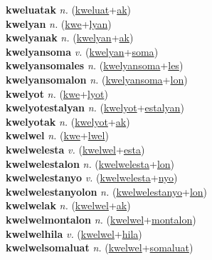 \textbf{kweluatak} \textit{n.} (\hyperref[kweluat]{kweluat}+\hyperref[ak]{ak})
 \label{kweluatak} \\
\textbf{kwelyan} \textit{n.} (\hyperref[kwe]{kwe}+\hyperref[lyan]{lyan})
 \label{kwelyan} \\
\textbf{kwelyanak} \textit{n.} (\hyperref[kwelyan]{kwelyan}+\hyperref[ak]{ak})
 \label{kwelyanak} \\
\textbf{kwelyansoma} \textit{v.} (\hyperref[kwelyan]{kwelyan}+\hyperref[soma]{soma})
 \label{kwelyansoma} \\
\textbf{kwelyansomales} \textit{n.} (\hyperref[kwelyansoma]{kwelyansoma}+\hyperref[les]{les})
 \label{kwelyansomales} \\
\textbf{kwelyansomalon} \textit{n.} (\hyperref[kwelyansoma]{kwelyansoma}+\hyperref[lon]{lon})
 \label{kwelyansomalon} \\
\textbf{kwelyot} \textit{n.} (\hyperref[kwe]{kwe}+\hyperref[lyot]{lyot})
 \label{kwelyot} \\
\textbf{kwelyotestalyan} \textit{n.} (\hyperref[kwelyot]{kwelyot}+\hyperref[estalyan]{estalyan})
 \label{kwelyotestalyan} \\
\textbf{kwelyotak} \textit{n.} (\hyperref[kwelyot]{kwelyot}+\hyperref[ak]{ak})
 \label{kwelyotak} \\
\textbf{kwelwel} \textit{n.} (\hyperref[kwe]{kwe}+\hyperref[lwel]{lwel})
 \label{kwelwel} \\
\textbf{kwelwelesta} \textit{v.} (\hyperref[kwelwel]{kwelwel}+\hyperref[esta]{esta})
 \label{kwelwelesta} \\
\textbf{kwelwelestalon} \textit{n.} (\hyperref[kwelwelesta]{kwelwelesta}+\hyperref[lon]{lon})
 \label{kwelwelestalon} \\
\textbf{kwelwelestanyo} \textit{v.} (\hyperref[kwelwelesta]{kwelwelesta}+\hyperref[nyo]{nyo})
 \label{kwelwelestanyo} \\
\textbf{kwelwelestanyolon} \textit{n.} (\hyperref[kwelwelestanyo]{kwelwelestanyo}+\hyperref[lon]{lon})
 \label{kwelwelestanyolon} \\
\textbf{kwelwelak} \textit{n.} (\hyperref[kwelwel]{kwelwel}+\hyperref[ak]{ak})
 \label{kwelwelak} \\
\textbf{kwelwelmontalon} \textit{n.} (\hyperref[kwelwel]{kwelwel}+\hyperref[montalon]{montalon})
 \label{kwelwelmontalon} \\
\textbf{kwelwelhila} \textit{v.} (\hyperref[kwelwel]{kwelwel}+\hyperref[hila]{hila})
 \label{kwelwelhila} \\
\textbf{kwelwelsomaluat} \textit{n.} (\hyperref[kwelwel]{kwelwel}+\hyperref[somaluat]{somaluat})
